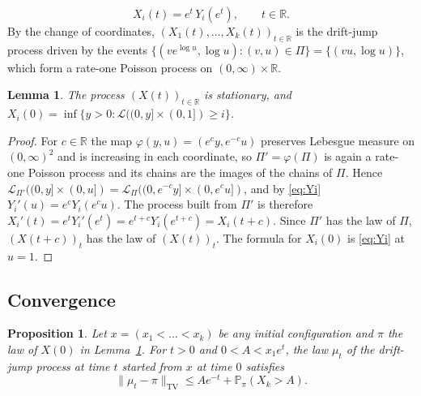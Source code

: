 \documentclass[11pt]{amsart}
\newtheorem{lemma}[theorem]{Lemma}
\newtheorem{proposition}[theorem]{Proposition}
\theoremstyle{remark}
\numberwithin{equation}{section}
\newcommand{\Pp}{\mathbb P}
\begin{document}
\[
X_i(t)=e^{t}\,Y_i(e^t),\qquad t\in\mathbb R .
\]
By the change of coordinates, $(X_1(t),\dots,X_k(t))_{t\in\mathbb R}$ is the drift-jump process driven by the events $\{(ve^{\log u},\log u):(v,u)\in\Pi\}=\{(vu,\log u)\}$, which form a rate-one Poisson process on $(0,\infty)\times\mathbb R$.

\begin{lemma}\label{lem:stat}
The process $(X(t))_{t\in\mathbb R}$ is stationary, and $X_i(0)=\inf\{y>0:\mathcal L((0,y]\times(0,1])\ge i\}$.
\end{lemma}

\begin{proof}
For $c\in\mathbb R$ the map $\varphi(y,u)=(e^{c}y,e^{-c}u)$ preserves Lebesgue measure on $(0,\infty)^2$ and is increasing in each coordinate, so $\Pi'=\varphi(\Pi)$ is again a rate-one Poisson process and its chains are the images of the chains of $\Pi$. Hence $\mathcal L_{\Pi'}((0,y]\times(0,u])=\mathcal L_{\Pi}((0,e^{-c}y]\times(0,e^{c}u])$, and by \eqref{eq:Yi} $Y_i'(u)=e^cY_i(e^cu)$. The process built from $\Pi'$ is therefore $X_i'(t)=e^tY_i'(e^t)=e^{t+c}Y_i(e^{t+c})=X_i(t+c)$. Since $\Pi'$ has the law of $\Pi$, $(X(t+c))_t$ has the law of $(X(t))_t$. The formula for $X_i(0)$ is \eqref{eq:Yi} at $u=1$.
\end{proof}

\subsection{Convergence}
\begin{proposition}\label{prop:conv}
Let $x=(x_1<\dots<x_k)$ be any initial configuration and $\pi$ the law of $X(0)$ in Lemma~\ref{lem:stat}. For $t>0$ and $0<A<x_1e^{t}$, the law $\mu_t$ of the drift-jump process at time $t$ started from $x$ at time $0$ satisfies
\[
\|\mu_t-\pi\|_{\mathrm{TV}}\le Ae^{-t}+\Pp_\pi(X_k>A).
\]
\end{proposition}
\end{document}
